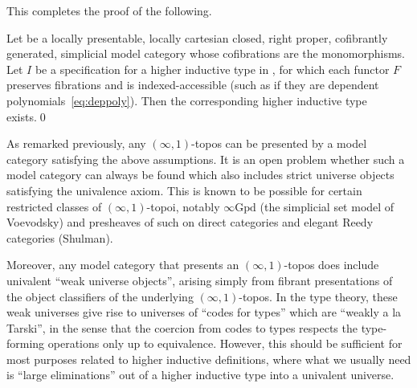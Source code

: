 \documentclass{amsart}
\begin{document}
This completes the proof of the following.

\begin{thm}\label{thm:lp-hit}
  Let \sC be a locally presentable, locally cartesian closed, right proper, cofibrantly generated, simplicial model category whose cofibrations are the monomorphisms.
  Let $I$ be a specification for a higher inductive type in \sC, for which each functor $F$ preserves fibrations and is indexed-accessible (such as if they are dependent polynomials~\eqref{eq:deppoly}).
  Then the corresponding higher inductive type exists.\qed
\end{thm}

As remarked previously, any $(\infty,1)$-topos can be presented by a model category satisfying the above assumptions.
It is an open problem whether such a model category can always be found which also includes strict universe objects satisfying the univalence axiom.
This is known to be possible for certain restricted classes of $(\infty,1)$-topoi, notably $\infty\mathrm{Gpd}$ (the simplicial set model of Voevodsky) and presheaves of such on direct categories and elegant Reedy categories (Shulman).

Moreover, any model category that presents an $(\infty,1)$-topos does include univalent ``weak universe objects'', arising simply from fibrant presentations of the object classifiers of the underlying $(\infty,1)$-topos.
In the type theory, these weak universes give rise to universes of ``codes for types'' which are ``weakly a la Tarski'', in the sense that the coercion from codes to types respects the type-forming operations only up to equivalence.
However, this should be sufficient for most purposes related to higher inductive definitions, where what we usually need is ``large eliminations'' out of a higher inductive type into a univalent universe.


\end{document}
